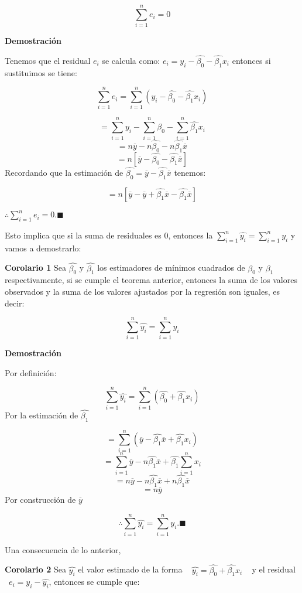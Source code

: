 \documentclass[
  a4paper,
  oneside,
  openany]{book}
\begin{document}
\[\sum_{i=1}^{n}e_{i}=0\]

\textbf{Demostración}

Tenemos que el residual \(e_{i}\) se calcula como: \(e_{i}=y_{i}-\hat{\beta_{0}}-\hat{\beta_1}x_{i}\) entonces si sustituimos se tiene:

\[\sum_{i=1}^{n}e_{i}=\sum_{i=1}^{n}\left(y_{i}-\hat{\beta_{0}}-\hat{\beta_1}x_{i}\right)\]

\[=\sum_{i=1}^{n}y_{i}-\sum_{i=1}^{n}\hat{\beta_{0}}-\sum_{i=1}^{n}\hat{\beta_{1}}x_{i}\]
\[=n\overline{y}-n\hat{\beta_{0}}-n\hat{\beta_{1}}\overline{x}\]
\[=n\left[\overline{y}-\hat{\beta_{0}}-\hat{\beta_{1}}\overline{x}\right]\]
Recordando que la estimación de \(\hat{\beta_{0}}=\overline{y}-\hat{\beta_{1}}\overline{x}\) tenemos:

\[=n\left[\overline{y}-\overline{y}+\hat{\beta_{1}}\overline{x}-\hat{\beta_{1}}\overline{x}\right]\]

\(\therefore \sum_{i=1}^{n}e_{i}=0. \blacksquare\)

Esto implica que si la suma de residuales es 0, entonces la \(\sum_{i=1}^{n}\hat{y_{i}}=\sum_{i=1}^{n}y_{i}\) y vamos a demostrarlo:

\textbf{Corolario 1} Sea \(\hat{\beta_{0}}\) y \(\hat{\beta_{1}}\) los estimadores de mínimos cuadrados de \(\beta_{0}\) y \(\beta_{1}\) respectivamente, si se cumple el teorema anterior, entonces la suma de los valores observados y la suma de los valores ajustados por la regresión son iguales, es decir:

\[\sum_{i=1}^{n}\hat{y_{i}}=\sum_{i=1}^{n}y_{i}\]

\textbf{Demostración}

Por definición:

\[\sum_{i=1}^{n}\hat{y_{i}}=\sum_{i=1}^{n}\left(\hat{\beta_{0}}+\hat{\beta_{1}}x_{i}\right)\]
Por la estimación de \(\hat{\beta_{1}}\)

\[=\sum_{i=1}^{n}\left(\overline{y}-\hat{\beta_{1}}\overline{x}+\hat{\beta_{1}}x_{i}\right)\]
\[=\sum_{i=1}^{n}\overline{y}-n\hat{\beta_{1}}\overline{x}+\hat{\beta_{1}}\sum_{i=1}^{n}x_{i}\]
\[=n\overline{y}-n\hat{\beta_{1}}\overline{x}+n\hat{\beta_{1}}\overline{x}\]
\[=n\overline{y}\]
Por construcción de \(\overline{y}\)

\[\therefore \sum_{i=1}^{n}\hat{y_{i}}=\sum_{i=1}^{n}y_{i}. \blacksquare\]

Una consecuencia de lo anterior,

\textbf{Corolario 2} Sea \(\hat{y_{i}}\) el valor estimado de la forma ~ \(\hat{y_{i}}=\hat{\beta_{0}}+\hat{\beta_{1}}x_{i}\) ~ y el residual ~\(e_{i}=y_{i}-\hat{y_{i}}\), entonces se cumple que:
\end{document}
